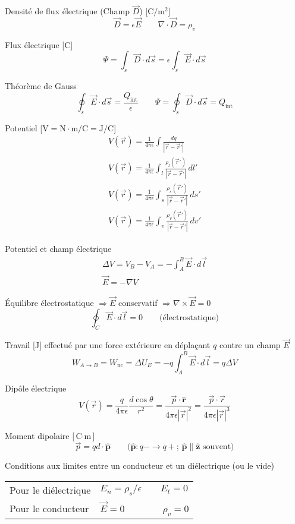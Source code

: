 \documentclass[10pt,landscape]{article}
\newcommand{\halfline}{\vspace{0.5em}}
\newcommand{\tableindent}{\hspace{1.5em}}
\newcommand{\uvec}[1]{\ensuremath{\boldsymbol{\hat{#1}}}}
\begin{document}
\begin{multicols}{3}
Densité de flux électrique (Champ $\vec{D}$)  [$\si{\coulomb/\metre^2}$]
\[ \vec{D} = \epsilon\vec{E}
\qquad \nabla \cdot \vec{D} = \rho_v \]

Flux électrique [\si{\coulomb}]
\[  \Psi = \int_{s} \vec{D} \cdot d\vec{s} = \epsilon \int_{s} \vec{E} \cdot d\vec{s} \]

Théorème de Gauss
\[ \oint_s \vec{E}\cdot d\vec{s} = \frac{Q_\text{int}}{\epsilon}
\qquad  \Psi = \oint_s \vec{D}\cdot d\vec{s} = Q_\text{int} \]

Potentiel [$\si{\volt} = \si{\newton\cdot\metre/\coulomb} = \si{\joule/\coulomb}$]
\begin{gather*}
V(\vec{r}) = \frac{1}{4\pi\epsilon} \int \frac{dq}{| \vec{r} - \vec{r}' | }  \\
V(\vec{r}) = \frac{1}{4\pi\epsilon} \int_{l} \frac{\rho_l(\vec{r}')}{| \vec{r} - \vec{r}' | } \,dl'  \\
V(\vec{r}) = \frac{1}{4\pi\epsilon} \int_{s} \frac{\rho_s(\vec{r}')}{| \vec{r} - \vec{r}'| } \,ds'  \\
V(\vec{r}) = \frac{1}{4\pi\epsilon} \int_{v} \frac{\rho_v(\vec{r}')}{| \vec{r} - \vec{r}' | } \,dv'  
\end{gather*}

Potentiel et champ électrique
\begin{gather*}
\Delta V = V_B - V_A  = -\int_A^B \vec{E}\cdot d\vec{l} \\
 \vec{E} = -\nabla V
\end{gather*}

Équilibre électrostatique $\Rightarrow \vec{E}$ conservatif  $\Rightarrow \nabla \times \vec{E} = 0$
\[  \oint_C \vec{E}\cdot d\vec{l}  = 0 \qquad \text{(électrostatique)}\]

Travail [\si{\joule}] effectué par une force extérieure en déplaçant $q$ contre un champ $\vec{E}$
\[ W_{A\to B} = W_\text{nc} = \Delta U_E = -q\int_{A}^{B} \vec{E}\cdot d\vec{l} = q\Delta V \]

Dipôle électrique
\[ V(\vec{r}) = \frac{q}{4\pi\epsilon} \frac{d\cos\theta}{r^2} =
\frac{\vec{p}\cdot\uvec{r}}{4\pi\epsilon|\vec{r}|^2} =
\frac{\vec{p}\cdot\vec{r}}{4\pi\epsilon|\vec{r}|^3} \]

Moment dipolaire [$\si{\coulomb\cdot\meter}$]
\[ \vec{p} = qd\cdot \uvec{p} \qquad \text{($\uvec{p}: q- \to q+$;  $\uvec{p}\parallel\uvec{z}$ souvent)} \]

\halfline
Conditions aux limites entre un conducteur et un diélectrique  (ou le vide)\\
\halfline
\begin{tabular}{@{\tableindent}ll@{}}
	Pour le diélectrique & $ E_n = {\rho_s}/{\epsilon} \qquad E_t = 0 $ \\
	Pour le conducteur  & $\vec{E} = 0 \qquad\qquad \rho_v = 0 $ \\
\end{tabular}


\end{multicols}
\end{document}
